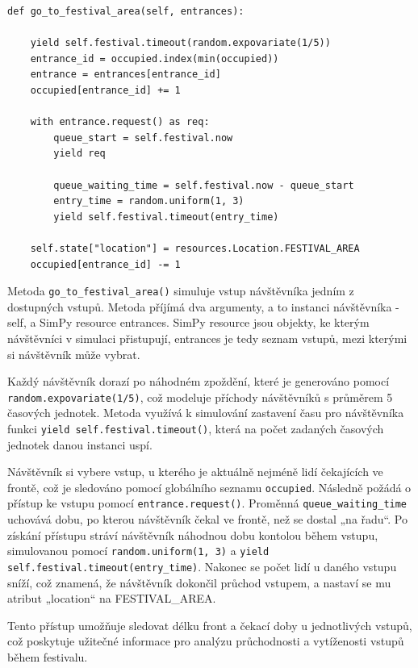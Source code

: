 \documentclass[12pt,a4paper]{article}
\begin{document}
\begin{verbatim}
def go_to_festival_area(self, entrances):
        
    yield self.festival.timeout(random.expovariate(1/5))
    entrance_id = occupied.index(min(occupied))
    entrance = entrances[entrance_id]
    occupied[entrance_id] += 1

    with entrance.request() as req:
        queue_start = self.festival.now  
        yield req 

        queue_waiting_time = self.festival.now - queue_start  
        entry_time = random.uniform(1, 3)
        yield self.festival.timeout(entry_time)
 
    self.state["location"] = resources.Location.FESTIVAL_AREA
    occupied[entrance_id] -= 1
\end{verbatim}

\sloppy
Metoda  \texttt{go\_to\_festival\_area()} simuluje vstup návštěvníka jedním z dostupných vstupů. Metoda příjímá dva argumenty, a to instanci 
návštěvníka - self, a SimPy resource entrances. SimPy resource jsou objekty, ke kterým návštěvníci v simulaci přistupují, entrances je tedy seznam 
vstupů, mezi kterými si návštěvník může vybrat.

\vspace{1em}
Každý návštěvník dorazí po náhodném zpoždění, které je generováno pomocí \texttt{random.expovariate(1/5)}, 
což modeluje příchody návštěvníků s průměrem 5 časových jednotek. Metoda využívá k simulování zastavení času 
pro návštěvníka funkci \texttt{yield self.festival.timeout()}, která na počet zadaných časových jednotek danou instanci uspí.

\vspace{1em}
Návštěvník si vybere vstup, u kterého je aktuálně nejméně lidí čekajících ve frontě, což je sledováno pomocí globálního seznamu \texttt{occupied}.
Následně požádá o přístup ke vstupu pomocí \texttt{entrance.request()}. Proměnná \texttt{queue\_waiting\_time} uchovává dobu, po kterou
 návštěvník čekal ve frontě, než se dostal „na řadu“. Po získání přístupu stráví návštěvník náhodnou dobu kontolou během vstupu, simulovanou pomocí \texttt{random.uniform(1, 3)} a \texttt{yield self.festival.timeout(entry\_time)}.  Nakonec se počet lidí u daného vstupu sníží, což znamená, 
že návštěvník dokončil průchod vstupem, a nastaví se mu atribut „location“ na FESTIVAL\_AREA.

\vspace{1em}
Tento přístup umožňuje sledovat délku front a čekací doby u jednotlivých vstupů, což poskytuje užitečné informace pro analýzu průchodnosti a vytíženosti vstupů během festivalu.
\end{document}
